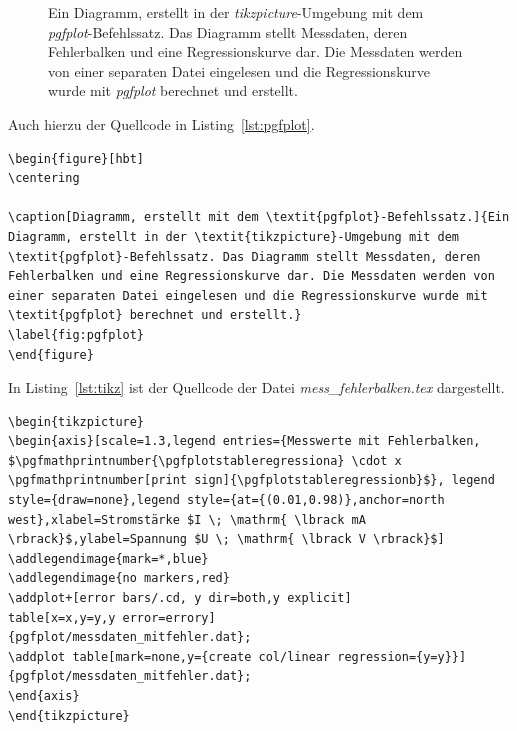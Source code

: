 \begin{figure}[hbt]
	\centering
	
	\caption[Diagramm, erstellt mit dem \textit{pgfplot}-Befehlssatz.]{Ein Diagramm, erstellt in der \textit{tikzpicture}-Umgebung mit dem \textit{pgfplot}-Befehlssatz. Das Diagramm stellt Messdaten, deren Fehlerbalken und eine Regressionskurve dar. Die Messdaten werden von einer separaten Datei eingelesen und die Regressionskurve wurde mit \textit{pgfplot} berechnet und erstellt.}
	\label{fig:pgfplot}
\end{figure}

\clearpage

Auch hierzu der Quellcode in Listing~\ref{lst:pgfplot}.

\begin{lstlisting}[caption=Quellcode der Abbildung~\ref{fig:pgfplot}.,label=lst:pgfplot]
\begin{figure}[hbt]
\centering

\caption[Diagramm, erstellt mit dem \textit{pgfplot}-Befehlssatz.]{Ein Diagramm, erstellt in der \textit{tikzpicture}-Umgebung mit dem \textit{pgfplot}-Befehlssatz. Das Diagramm stellt Messdaten, deren Fehlerbalken und eine Regressionskurve dar. Die Messdaten werden von einer separaten Datei eingelesen und die Regressionskurve wurde mit \textit{pgfplot} berechnet und erstellt.}
\label{fig:pgfplot}
\end{figure}
\end{lstlisting}

In Listing~\ref{lst:tikz} ist der Quellcode der Datei \textit{mess\_fehlerbalken.tex} dargestellt.

\begin{lstlisting}[caption=Quellcode der Datei \textit{mess\_fehlerbalken.tex}.,label=lst:tikz]
\begin{tikzpicture}
\begin{axis}[scale=1.3,legend entries={Messwerte mit Fehlerbalken,
$\pgfmathprintnumber{\pgfplotstableregressiona} \cdot x  
\pgfmathprintnumber[print sign]{\pgfplotstableregressionb}$}, legend style={draw=none},legend style={at={(0.01,0.98)},anchor=north west},xlabel=Stromstärke $I \; \mathrm{ \lbrack mA \rbrack}$,ylabel=Spannung $U \; \mathrm{ \lbrack V \rbrack}$]
\addlegendimage{mark=*,blue}
\addlegendimage{no markers,red}
\addplot+[error bars/.cd, y dir=both,y explicit]
table[x=x,y=y,y error=errory] 
{pgfplot/messdaten_mitfehler.dat};
\addplot table[mark=none,y={create col/linear regression={y=y}}]
{pgfplot/messdaten_mitfehler.dat};
\end{axis}
\end{tikzpicture}
\end{lstlisting}

